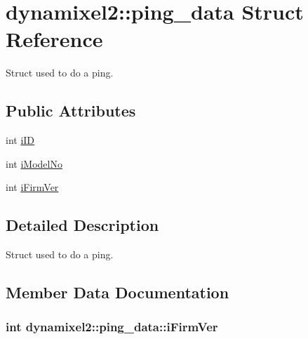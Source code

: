 \hypertarget{structdynamixel2_1_1ping__data}{}\section{dynamixel2\+:\+:ping\+\_\+data Struct Reference}
\label{structdynamixel2_1_1ping__data}


Struct used to do a ping.  


\subsection*{Public Attributes}
\begin{DoxyCompactItemize}
\item 
int \hyperlink{structdynamixel2_1_1ping__data_a7c8829a586a920b2abe49719957abd37}{i\+I\+D}
\item 
int \hyperlink{structdynamixel2_1_1ping__data_a1786b3e1400d2ff8b8361b367b52fbb7}{i\+Model\+No}
\item 
int \hyperlink{structdynamixel2_1_1ping__data_a869956077eab76548aaffde67817b2bf}{i\+Firm\+Ver}
\end{DoxyCompactItemize}


\subsection{Detailed Description}
Struct used to do a ping. 

\subsection{Member Data Documentation}
\hypertarget{structdynamixel2_1_1ping__data_a869956077eab76548aaffde67817b2bf}{}
\subsubsection[{i\+Firm\+Ver}]{\setlength{\rightskip}{0pt plus 5cm}int dynamixel2\+::ping\+\_\+data\+::i\+Firm\+Ver}\label{structdynamixel2_1_1ping__data_a869956077eab76548aaffde67817b2bf}
\hypertarget{structdynamixel2_1_1ping__data_a7c8829a586a920b2abe49719957abd37}{}
